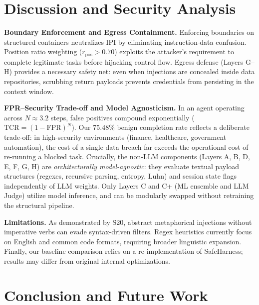 \documentclass[runningheads]{llncs}
\begin{document}
\section{Discussion and Security Analysis}
\label{sec:discussion}

\noindent\textbf{Boundary Enforcement and Egress Containment.} Enforcing boundaries on structured containers neutralizes IPI by eliminating instruction-data confusion. Position ratio weighting ($r_{\text{pos}} > 0.70$) exploits the attacker's requirement to complete legitimate tasks before hijacking control flow. Egress defense (Layers G--H) provides a necessary safety net: even when injections are concealed inside data repositories, scrubbing return payloads prevents credentials from persisting in the context window.

\smallskip\noindent\textbf{FPR--Security Trade-off and Model Agnosticism.} In an agent operating across $N \approx 3.2$ steps, false positives compound exponentially ($\text{TCR} = (1{-}\text{FPR})^N$). Our 75.48\% benign completion rate reflects a deliberate trade-off: in high-security environments (finance, healthcare, government automation), the cost of a single data breach far exceeds the operational cost of re-running a blocked task. Crucially, the non-LLM components (Layers A, B, D, E, F, G, H) are \textit{architecturally model-agnostic}: they evaluate textual payload structures (regexes, recursive parsing, entropy, Luhn) and session state flags independently of LLM weights. Only Layers C and C+ (ML ensemble and LLM Judge) utilize model inference, and can be modularly swapped without retraining the structural pipeline.

\smallskip\noindent\textbf{Limitations.} As demonstrated by S20, abstract metaphorical injections without imperative verbs can evade syntax-driven filters. Regex heuristics currently focus on English and common code formats, requiring broader linguistic expansion. Finally, our baseline comparison relies on a re-implementation of SafeHarness; results may differ from original internal optimizations.

\section{Conclusion and Future Work}
\label{sec:conclusion}
\end{document}
